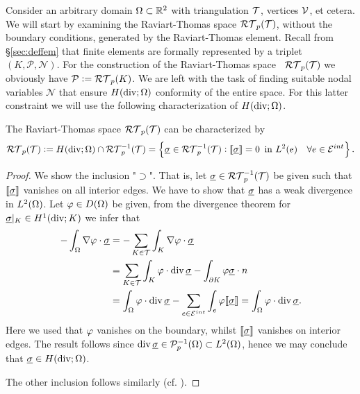 \documentclass[thesis.tex]{subfiles}
\begin{document}
Consider an arbitrary domain $ \Omega \subset \mathbb{R}^2$ with triangulation $ \mathcal{T}$, vertices $ \mathcal{V}$, et cetera.
We will start by examining the Raviart-Thomas space $\mathcal{RT}_p( \mathcal{T})$, without the boundary conditions,
generated by the Raviart-Thomas element.
Recall from \S\ref{sec:deffem} that finite elements are formally represented by a triplet $(K, \mathcal{P}, \mathcal{N})$. For
the construction of the Raviart-Thomas space ~$\mathcal{RT}_p( \mathcal{T})$
we obviously have $\mathcal{P} := \mathcal{RT}_p(K)$.
We are left with the task of finding suitable nodal variables $\mathcal{N}$ that ensure $H(\operatorname{div};  \Omega)$ conformity of the entire space.
For this latter constraint we will use the following characterization of $H(\operatorname{div};  \Omega)$.
\begin{thm}
  \label{thm:rtjump}
  The Raviart-Thomas space $\mathcal{RT}_p( \mathcal{T})$  can be characterized by
  \[
    \mathcal{RT}_p( \mathcal{T}) := H(\operatorname{div};  \Omega) \cap \mathcal{RT}_p^{-1}( \mathcal{T})  = \set{\underline{\sigma}\in \mathcal{RT}_p^{-1}( \mathcal{T}) : \llbracket \underline{\sigma}\rrbracket = 0 \, \text{ in } L^2(e) \quad \forall e \in \mathcal{E}^{int}}.
  \]
\end{thm}
\begin{proof}
  We show the inclusion "$\supset$". That is, let $\underline{\sigma} \in \mathcal{RT}_p^{-1}( \mathcal{T})$ be given such that $\llbracket \underline{\sigma} \rrbracket$
  vanishes on all interior edges. We have to show that $\underline{\sigma}$ has a weak divergence in $L^2( \Omega)$.
  Let $\varphi \in D( \Omega)$ be given, from the divergence theorem for $\underline{\sigma}|_K \in H^1(\operatorname{div}; K)$ we infer that
  \begin{align*}
    - \int_{ \Omega}  \nabla \varphi \cdot \underline{\sigma} &= - \sum_{K \in  \mathcal{T}} \int_K \nabla \varphi \cdot \underline{\sigma} \\
    &=  \sum_{K \in  \mathcal{T}} \int_K \varphi \cdot \operatorname{div} \underline{\sigma} - \int_{\partial K} \varphi \underline{\sigma} \cdot n\\
    &=  \int_{ \Omega} \varphi \cdot \operatorname{div} \underline{\sigma} - \sum_{e \in  \mathcal{E}^{int}} \int_e \varphi \llbracket \underline{\sigma} \rrbracket = \int_{ \Omega} \varphi \cdot \operatorname{div} \underline{\sigma}.
  \end{align*}
  Here we used that $\varphi$ vanishes on the boundary, whilst $\llbracket \underline{\sigma} \rrbracket$ vanishes on interior edges.
  The result follows since $\operatorname{div} \underline{\sigma} \in \mathcal{P}_p^{-1}(\Omega) \subset  L^2( \Omega)$, hence we may conclude that $\underline{\sigma} \in H(\operatorname{div};  \Omega)$.

  The other inclusion follows similarly (cf. \cite[Thm~3.2]{gaticasimple}).
\end{proof}
\end{document}
